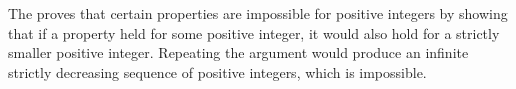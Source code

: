 The  proves that certain properties are impossible for positive integers by showing that if a property held for some positive integer, it would also hold for a strictly smaller positive integer. Repeating the argument would produce an infinite strictly decreasing sequence of positive integers, which is impossible.
